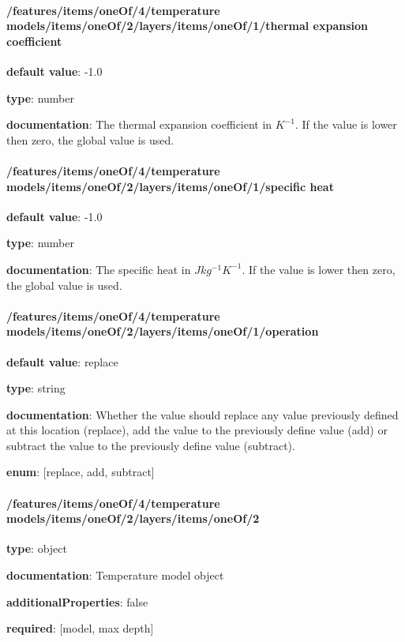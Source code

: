 \begin{itemized}
\end{itemized}\paragraph{/features/items/oneOf/4/temperature models/items/oneOf/2/layers/items/oneOf/1/thermal expansion coefficient} \begin{itemized}
\item {\bf default value}: -1.0
\item {\bf type}: number
\item {\bf documentation}: The thermal expansion coefficient in $K^{-1}$. If the value is lower then zero, the global value is used.
\end{itemized}\paragraph{/features/items/oneOf/4/temperature models/items/oneOf/2/layers/items/oneOf/1/specific heat} \begin{itemized}
\item {\bf default value}: -1.0
\item {\bf type}: number
\item {\bf documentation}: The specific heat in $J kg^{-1} K^{-1}$. If the value is lower then zero, the global value is used.
\end{itemized}\paragraph{/features/items/oneOf/4/temperature models/items/oneOf/2/layers/items/oneOf/1/operation} \begin{itemized}
\item {\bf default value}: replace
\item {\bf type}: string
\item {\bf documentation}: Whether the value should replace any value previously defined at this location (replace), add the value to the previously define value (add) or subtract the value to the previously define value (subtract).
\item {\bf enum}: [replace, add, subtract]\end{itemized}\paragraph{/features/items/oneOf/4/temperature models/items/oneOf/2/layers/items/oneOf/2} \begin{itemized}
\item {\bf type}: object
\item {\bf documentation}: Temperature model object
\item {\bf additionalProperties}: false
\item {\bf required}: [model, max depth]\end{itemized}
